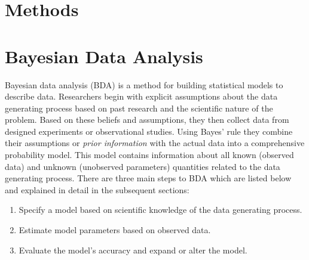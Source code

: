 \documentclass{article}
\begin{document}
\section{Methods}
\section*{Bayesian Data Analysis}
Bayesian data analysis (BDA) is a method for building statistical models to describe data.  Researchers begin with explicit assumptions about the data generating process based on past research and the scientific nature of the problem. Based on these beliefs and assumptions, they then collect data from designed experiments or observational studies. Using Bayes' rule they combine their assumptions or \textit{prior information} with the actual data into a comprehensive probability model. This model contains information about all known (observed data) and unknown (unobserved parameters) quantities related to the data generating process.
There are three main steps to BDA which are listed below and explained in detail in the subsequent sections:
\begin{enumerate}
\item Specify a model based on scientific knowledge of the data generating process.
\item Estimate model parameters based on observed data.
\item Evaluate the model's accuracy and expand or alter the model.
\end{enumerate}
\end{document}
